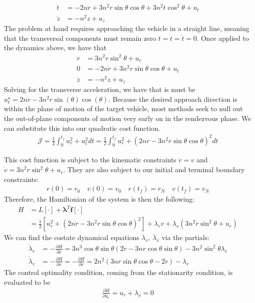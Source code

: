 \documentclass[conf]{new-aiaa}
\begin{document}
\begin{singlespace}
\begin{align}
    \ddot{t} &= -2n\dot{r} +3n^2r\sin\theta\cos\theta + 3n^2t\cos^2\theta + u_t \\
    \ddot{z} &= - n^2z + u_z 
\end{align}
The problem at hand requires approaching the vehicle in a straight line, meaning that the transversal components must remain zero $t=\dot{t}=\ddot{t}=0$. Once applied to the dynamics above, we have that
\begin{align}
    \ddot{r} &= 3n^2 r \sin^2\theta + u_r\\
    0 &= -2n\dot{r} +3n^2r \sin\theta\cos\theta + u_t \\
    \ddot{z} &= - n^2z + u_z 
\end{align}
Solving for the transverse acceleration, we have that is must be $u_t^\star = 2n\dot{r} - 3n^2r\sin(\theta)\cos(\theta)$. Because the desired approach direction is within the plane of motion of the target vehicle, most methods seek to null out the out-of-plane components of motion very early on in the rendezvous phase. We can substitute this into our quadratic cost function.
\begin{align}
    \mathcal{J} = \frac{1}{2}\int_0^{t_f} u_r^2 + u_t^2 dt = \frac{1}{2}\int_0^{t_f} u_r^2 + (2n\dot{r} - 3n^2r\sin\theta\cos\theta)^2dt
\end{align}

This cost function is subject to the kinematic constraints $\dot{r} = v$ and $\dot{v}= 3n^2 r \sin^2\theta + u_r $. They are also subject to our initial and terminal boundary constraints:
\begin{align}
    r(0) = r_0 \quad v(0) = v_0 \quad r(t_f) = r_N \quad v(t_f) = v_N
\end{align}
Therefore, the Hamiltonian of the system is then the following:
\begin{align}
    H &= L[\cdot] + \boldsymbol{\lambda}^T \bm{f}[\cdot] \\
      &=\frac{1}{2} [u_r^2 + (2n\dot{r} - 3n^2r\sin\theta\cos\theta)^2]+ \lambda_rv + \lambda_v(3n^2 r \sin^2\theta + u_r)
\end{align}
We can find the costate dynamical equations $\dot{\lambda}_r, \ \dot{\lambda}_v$ via the partials:
\begin{align}
    \dot{\lambda}_r &= -\frac{\partial H}{\partial r} = 
        3n^3\cos{\theta}\sin{\theta}\left(2\dot{r}-3nr\cos{\theta}\sin{\theta}\right) - 3n^2\sin^2\theta \lambda_v \\
    \dot{\lambda}_v &= -\frac{\partial H}{\partial v} =  -\frac{\partial H}{\partial \dot{r}} =  2n^2(3nr\sin\theta \cos\theta -2\dot{r}) - \lambda_r
\end{align}
The control optimality condition, coming from the stationarity condition, is evaluated to be
\begin{align}
    \frac{\partial H}{\partial u_r} = u_r + \lambda_v = 0
\end{align}


\end{singlespace}
\end{document}
